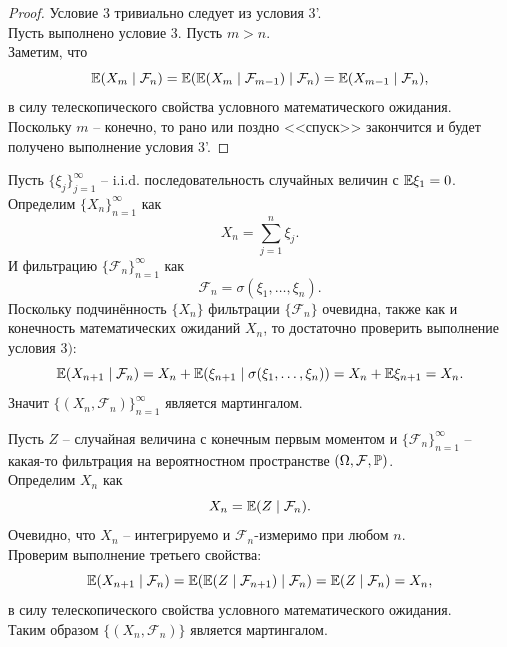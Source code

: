\begin{proof}
    Условие 3 тривиально следует из условия 3'. \\
    Пусть выполнено условие 3. Пусть $m > n$. \\
    Заметим, что 
    \[
        \Ex(X_m \mid \mathcal{F}_n) = \Ex(\Ex(X_m \mid \mathcal{F}_{m - 1}) \mid \mathcal{F}_n) = \Ex(X_{m - 1} \mid \mathcal{F}_n),
    \]
    в силу телескопического свойства условного математического ожидания. Поскольку $m$ -- конечно, то рано или поздно <<спуск>> закончится и будет получено выполнение условия 3'.
\end{proof}
\begin{example}
    Пусть $\{\xi_j\}_{j = 1}^{\infty}$ -- i.i.d. последовательность случайных величин с $\Ex \xi_1 = 0$. Определим $\{X_n\}_{n = 1}^{\infty}$ как 
    \[
        X_n = \sum\limits_{j = 1}^n \xi_j.
    \]
    И фильтрацию $\{\mathcal{F}_n\}_{n = 1}^{\infty}$ как 
    \[
        \mathcal{F}_n = \sigma(\xi_1, \ldots, \xi_n).
    \]
    Поскольку подчинённость $\{X_n\}$ фильтрации $\{\mathcal{F}_n\}$ очевидна, также как и конечность математических ожиданий $X_n$, то достаточно проверить выполнение условия $3)$:
    \[
        \Ex(X_{n + 1}\mid \mathcal{F}_n) = X_n + \Ex(\xi_{n + 1}\mid \sigma(\xi_1, \ldots, \xi_n)) = X_n + \Ex \xi_{n + 1} = X_n.
    \]
    Значит $\{(X_n, \mathcal{F}_n)\}_{n = 1}^\infty$ является мартингалом.
\end{example}
\begin{example}
    Пусть $Z$ -- случайная величина с конечным первым моментом и $\{\mathcal{F}_n\}_{n = 1}^{\infty}$ -- какая-то фильтрация на вероятностном пространстве $(\Omega, \mathcal{F}, \P)$. \\
    Определим $X_n$ как 
    \[
        X_n = \Ex(Z \mid \mathcal{F}_n).
    \]
    Очевидно, что $X_n$ -- интегрируемо и $\mathcal{F}_n$-измеримо при любом $n$. \\
    Проверим выполнение третьего свойства:
    \[
        \Ex(X_{n + 1}\mid \mathcal{F}_n) = \Ex(\Ex(Z \mid \mathcal{F}_{n + 1}) \mid \mathcal{F}_n) = \Ex(Z \mid \mathcal{F}_n) = X_n,
    \]
    в силу телескопического свойства условного математического ожидания. \\
    Таким образом $\{(X_n, \mathcal{F}_n)\}$ является мартингалом.
\end{example}
